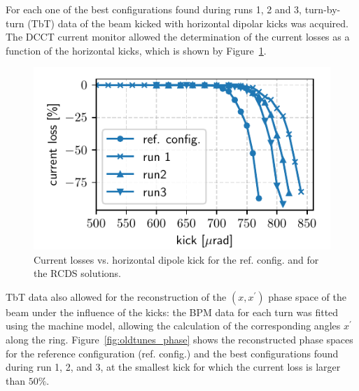 \documentclass[a4paper,
               keeplastbox,   %
               ]{jacow}
\begin{document}
For each one of the best configurations found during runs 1, 2 and 3, turn-by-turn (TbT) data of the beam kicked with horizontal dipolar kicks was acquired. The DCCT current monitor allowed the determination of the current losses as a function of the horizontal kicks, which is shown by Figure~\ref{fig:loss_kicks}. 
\begin{figure}[!h]
   \includegraphics[width=\columnwidth]{old_tunes_kick_resilience.pdf}
   \caption{Current losses vs. horizontal dipole kick for the ref. config. and for the RCDS solutions.}
   \label{fig:loss_kicks}
\end{figure}
TbT data also allowed for the reconstruction of the $(x,x^\prime)$ phase space of the beam under the influence of the kicks: the BPM data for each turn was fitted using the machine model, allowing the calculation of the corresponding angles $x^\prime$ along the ring. Figure~\ref{fig:oldtunes_phase} shows the reconstructed phase spaces for the reference configuration (ref. config.) and the best configurations found during run 1, 2, and 3, at the smallest kick for which the current loss is larger than $50\%$. 
\end{document}

